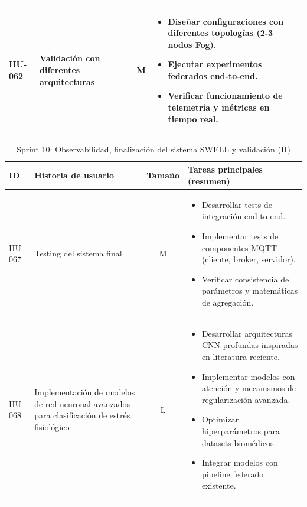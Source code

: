 \documentclass{report}
\begin{document}
\begin{table}[H]
\begin{tabular}{|l|p{4.8cm}|c|p{5.6cm}|}
HU-062 &
Validación con diferentes arquitecturas &
M &
\begin{itemize}\setlength\itemsep{0.15em}
  \item Diseñar configuraciones con diferentes topologías (2-3 nodos Fog).
  \item Ejecutar experimentos federados end-to-end.
  \item Verificar funcionamiento de telemetría y métricas en tiempo real.
\end{itemize}
\\ \hline

\end{tabular}
\end{table}
\begin{table}[H]
\centering
\footnotesize
\caption{Sprint 10: Observabilidad, finalización del sistema SWELL y validación (II)}
\label{tab:sprint10b}
\renewcommand{\arraystretch}{1.2}
\setlength{\tabcolsep}{4pt}
\begin{tabular}{|l|p{4.8cm}|c|p{5.6cm}|}
\hline
\textbf{ID} & \textbf{Historia de usuario} & \textbf{Tamaño} & \textbf{Tareas principales (resumen)} \\ \hline

HU-067 &
Testing del sistema final &
M &
\begin{itemize}\setlength\itemsep{0.15em}
  \item Desarrollar tests de integración end-to-end.
  \item Implementar tests de componentes MQTT (cliente, broker, servidor).
  \item Verificar consistencia de parámetros y matemáticas de agregación.
\end{itemize}
\\ \hline

HU-068 &
Implementación de modelos de red neuronal avanzados para clasificación de estrés fisiológico &
L &
\begin{itemize}\setlength\itemsep{0.15em}
  \item Desarrollar arquitecturas CNN profundas inspiradas en literatura reciente.
  \item Implementar modelos con atención y mecanismos de regularización avanzada.
  \item Optimizar hiperparámetros para datasets biomédicos.
  \item Integrar modelos con pipeline federado existente.
\end{itemize}
\\ \hline


\end{tabular}
\end{table}
\end{document}
